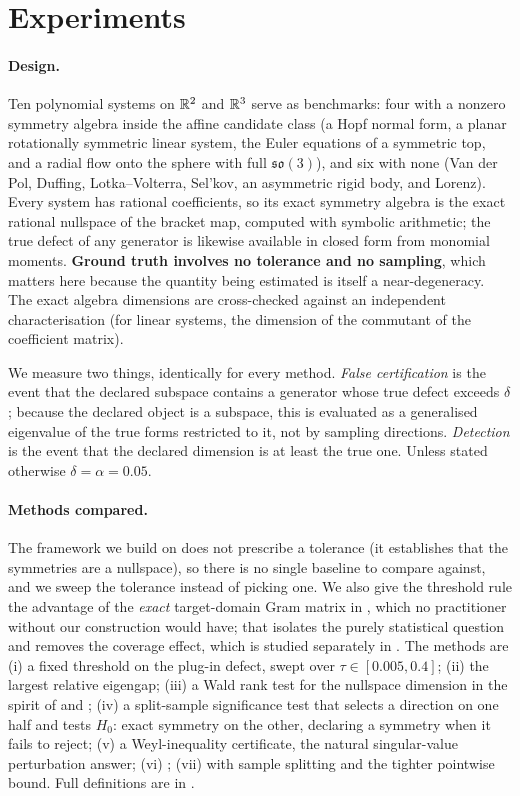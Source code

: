 \section{Experiments}
\label{sec:experiments}

\paragraph{Design.} Ten polynomial systems on $\mathbb{R}^2$ and $\mathbb{R}^3$ serve as
benchmarks: four with a nonzero symmetry algebra inside the affine candidate
class (a Hopf normal form, a planar rotationally symmetric linear system, the
Euler equations of a symmetric top, and a radial flow onto the sphere with
full $\mathfrak{so}(3)$), and six with none (Van der Pol, Duffing, Lotka--Volterra, Sel'kov, an asymmetric rigid body, and Lorenz). Every system has
rational coefficients, so its exact symmetry algebra is the exact rational
nullspace of the bracket map, computed with symbolic arithmetic; the true
defect of any generator is likewise available in closed form from monomial
moments. \textbf{Ground truth involves no tolerance and no sampling}, which
matters here because the quantity being estimated is itself a near-degeneracy.
The exact algebra dimensions are cross-checked against an independent
characterisation (for linear systems, the dimension of the commutant of the
coefficient matrix).

We measure two things, identically for every method. \emph{False
certification} is the event that the declared subspace contains a generator
whose true defect exceeds $\delta$; because the declared object is a subspace,
this is evaluated as a generalised eigenvalue of the true forms restricted to
it, not by sampling directions. \emph{Detection} is the event that the
declared dimension is at least the true one. Unless stated otherwise $\delta =
\alpha = 0.05$.

\paragraph{Methods compared.} The framework
we build on does not prescribe a tolerance (it establishes that the symmetries
are a nullspace), so there is no single baseline to compare against, and we
sweep the tolerance instead of picking one. We also give the threshold rule
the advantage of the \emph{exact} target-domain Gram matrix in
, which no practitioner without our construction would
have; that isolates the purely statistical question and removes the coverage
effect, which is studied separately in . The methods are
(i) a fixed threshold on the plug-in defect, swept over $\tau \in [0.005,
0.4]$; (ii) the largest relative eigengap; (iii) a Wald rank test for the
nullspace dimension in the spirit of \citet{robin2000tests} and
\citet{kleibergen2006generalized}; (iv) a split-sample significance test that
selects a direction on one half and tests $H_0$: exact symmetry on the other,
declaring a symmetry when it fails to reject; (v) a Weyl-inequality
certificate, the natural singular-value perturbation answer; (vi) \symcert;
(vii) \symcert{} with sample splitting and the tighter pointwise bound. Full
definitions are in .

